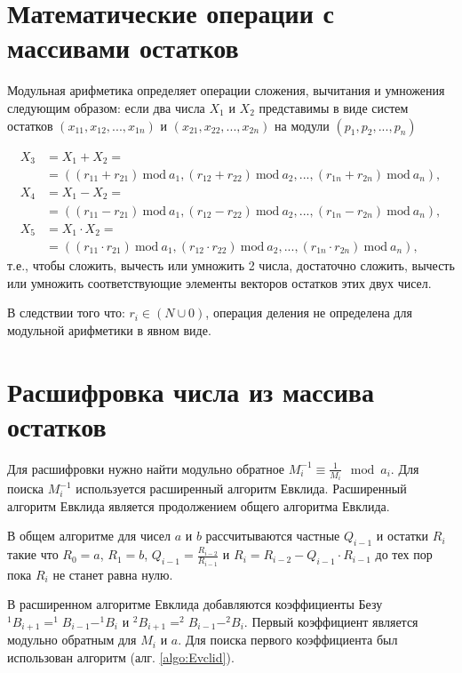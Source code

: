 \documentclass[10pt]{article}
\begin{document}
\section{Математические операции с массивами остатков}

Модульная арифметика \cite{omondi2007residue, soderstrand1986residue} определяет операции сложения, вычитания и умножения следующим образом: если два числа $X_1$ и $X_2$ представимы в виде систем остатков $(x_{11}, x_{12}, ..., x_{1n}) $ и $(x_{21}, x_{22}, ..., x_{2n})$ на модули $(p_1, p_2, ..., p_n)$

\begin{align} 
	X_3 &= X_1 + X_2 = \nonumber \\ 
	& = ((r_{11} + r_{21})\ \mathrm{mod}\ a_1, (r_{12} + r_{22})\ \mathrm{mod}\ a_2, ..., (r_{1n} + r_{2n})\ \mathrm{mod}\ a_n), \\
	X_4 &= X_1 - X_2 = \nonumber \\ 
	& =((r_{11} - r_{21})\ \mathrm{mod}\ a_1, (r_{12} - r_{22})\ \mathrm{mod}\ a_2, ..., (r_{1n} - r_{2n})\ \mathrm{mod}\ a_n), \\
	X_5 &= X_1 \cdot X_2 = \nonumber \\ 
	& = ((r_{11} \cdot r_{21})\ \mathrm{mod}\ a_1, (r_{12} \cdot r_{22})\ \mathrm{mod}\ a_2, ..., (r_{1n} \cdot r_{2n})\ \mathrm{mod}\ a_n), 
\end{align}
т.е., чтобы сложить, вычесть или умножить 2 числа, достаточно сложить, вычесть или умножить соответствующие элементы векторов остатков этих двух чисел.

В следствии того что: $r_i \in (N \cup 0) $, операция деления не определена для модульной арифметики в явном виде.

\section{Расшифровка числа из массива остатков}

Для расшифровки нужно найти модульно обратное $M_i^{-1}\equiv\frac{1}{M_i}\mod a_i$. Для поиска $M_i^{-1}$ используется расширенный алгоритм Евклида.
Расширенный алгоритм Евклида \cite{Okulov2011} является продолжением общего алгоритма Евклида. 

В общем алгоритме для чисел $a$ и $b$ рассчитываются частные $Q_{i-1}$ и остатки $R_i$ такие что $R_0 = a$, $R_1 = b$, $Q_{i-1} = \frac{R_{i-2}}{R_{i-1}}$ и $R_i = R_{i-2} - Q_{i-1} \cdot R_{i-1}$ до тех пор пока $R_i$ не станет равна нулю.

В расширенном алгоритме Евклида добавляются коэффициенты Безу $^1B_{i+1} = ^1B_{i-1} - ^1B_{i}$ и $^2B_{i+1} = ^2B_{i-1} - ^2B_{i}$. Первый коэффициент является модульно обратным для $M_i$ и $a$. Для поиска первого коэффициента был использован алгоритм (алг. \ref{algo:Evclid}).
\end{document}
